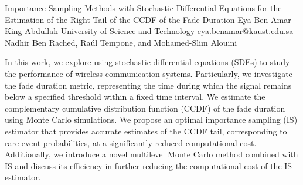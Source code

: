 \begin{talk}
  {Importance Sampling Methods with Stochastic Differential Equations for the Estimation of the Right Tail of the CCDF of the Fade Duration}%
  {Eya Ben Amar}%
  {King Abdullah University of Science and Technology}%
  {eya.benamar@kaust.edu.sa}%
  {Nadhir Ben Rached, Ra\'ul Tempone, and Mohamed-Slim Alouini}%
  
    
In this work, we explore using stochastic differential equations (SDEs) to study the performance of wireless communication systems. Particularly, we investigate the fade duration metric, representing the time during which the signal remains below a specified threshold within a fixed time interval. We estimate the complementary cumulative distribution function (CCDF) of the fade duration using Monte Carlo simulations. We propose an optimal importance sampling (IS) estimator that provides accurate estimates of the CCDF tail, corresponding to rare event probabilities, at a significantly reduced computational cost. Additionally, we introduce a novel multilevel Monte Carlo method combined with IS and discuss its efficiency in further reducing the computational cost of the IS estimator.
\medskip

\end{talk}


